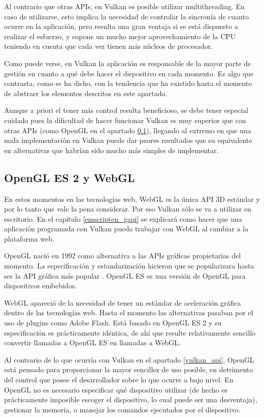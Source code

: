 Al contrario que otras APIs, en Vulkan es posible utilizar multithreading. En caso de utilizarse, esto implica la necesidad de controlar la sincronía de cuanto ocurre en la aplicación, pero resulta una gran ventaja si se está dispuesto a realizar el esfuerzo, y supone un mucho mejor aprovechamiento de la CPU teniendo en cuenta que cada vez tienen más núcleos de procesador.

Como puede verse, en Vulkan la aplicación es responsable de la mayor parte de gestión en cuanto a qué debe hacer el dispositivo en cada momento. Es algo que contrasta, como se ha dicho, con la tendencia que ha existido hasta el momento de abstraer los elementos descritos en este apartado. 

Aunque a priori el tener más control resulta beneficioso, se debe tener especial cuidado pues la dificultad de hacer funcionar Vulkan es muy superior que con otras APIs (como OpenGL en el apartado \ref{opengl_webgl_api}), llegando al extremo en que una mala implementación en Vulkan puede dar peores resultados que su equivalente en alternativas que habrían sido mucho más simples de implementar.

\subsection{OpenGL ES 2 y WebGL}
\label{opengl_webgl_api}
En estos momentos en las tecnologías web, WebGL es la única API 3D estándar y por lo tanto que vale la pena considerar. Por eso Vulkan sólo se va a utilizar en escritorio. En el capítulo \ref{emscripten_gapi} se explicará como hacer que una aplicación programada con Vulkan pueda trabajar con WebGL al cambiar a la plataforma web.

OpenGL nació en 1992 como alternativa a las APIs gráficas propietarias del momento. La especificación y estandarización hicieron que se popularizara hasta ser la API gráfica más popular . OpenGL ES es una versión de OpenGL para dispositivos embebidos.

WebGL apareció de la necesidad de tener un estándar de aceleración gráfica dentro de las tecnologías web. Hasta el momento las alternativas pasaban por el uso de plugins como Adobe Flash. Está basado en OpenGL ES 2 y su especificación es prácticamente idéntica, de ahí que resulte relativamente sencillo convertir llamadas a OpenGL ES en llamadas a WebGL.

Al contrario de lo que ocurría con Vulkan en el apartado \ref{vulkan_api}, OpenGL está pensado para proporcionar la mayor sencillez de uso posible, en detrimento del control que posee el desarrollador sobre lo que ocurre a bajo nivel. En OpenGL no es necesario especificar qué dispositivo utilizar (de hecho es prácticamente imposible escoger el dispositivo, lo cual puede ser una desventaja), gestionar la memoria, o manejar los comandos ejecutados por el dispositivo.

